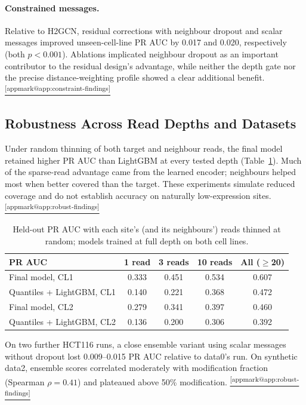 \documentclass[11pt,a4paper]{article}
\makeatletter
\DeclareRobustCommand{\applink}[1]{%
    \hyperref[#1]{\textsuperscript{\ref*{appmark@#1}}}}
\newcommand{\clone}{CL1}
\newcommand{\cltwo}{CL2}
\makeatother
\begin{document}
\paragraph{Constrained messages.}\label{sec:constrain}
Relative to H2GCN, residual corrections with neighbour
dropout and scalar messages improved unseen-cell-line
PR AUC by 0.017 and 0.020, respectively
(both $p<0.001$). Ablations implicated neighbour dropout as an important
contributor to the residual design's advantage, while
neither the depth gate nor the precise distance-weighting
profile showed a clear additional benefit.
\applink{app:constraint-findings}

\subsection{Robustness Across Read Depths and Datasets}
\label{sec:robust}
Under random thinning of both target and neighbour reads, the final model
retained higher PR AUC than LightGBM at every tested depth
(Table~\ref{tab:depth}). Much of the sparse-read advantage came from the
learned encoder; neighbours helped most when better covered than the target.
These experiments simulate reduced coverage and do not establish accuracy
on naturally low-expression sites.\applink{app:robust-findings}

\begin{table}[H]
    \centering\small
    \begin{tabular}{lcccc}
        \toprule
        \textbf{PR AUC} & \textbf{1 read} & \textbf{3 reads} & \textbf{10 reads} & \textbf{All ($\ge$20)} \\
        \midrule
        Final model, \clone & 0.333 & 0.451 & 0.534 & 0.607 \\
        Quantiles + LightGBM, \clone & 0.140 & 0.221 & 0.368 & 0.472 \\
        Final model, \cltwo & 0.279 & 0.341 & 0.397 & 0.460 \\
        Quantiles + LightGBM, \cltwo & 0.136 & 0.200 & 0.306 & 0.392 \\
        \bottomrule
    \end{tabular}
    \caption{Held-out PR AUC with each site's (and its neighbours') reads
    thinned at random; models trained at full depth on both cell lines.}
    \label{tab:depth}
\end{table}

On two further HCT116 runs, a close ensemble variant using scalar messages
without dropout lost 0.009--0.015 PR AUC relative to data0's run.
On synthetic data2, ensemble scores correlated moderately
with modification fraction (Spearman $\rho=0.41$) and
plateaued above 50\% modification.\applink{app:robust-findings}
\end{document}
